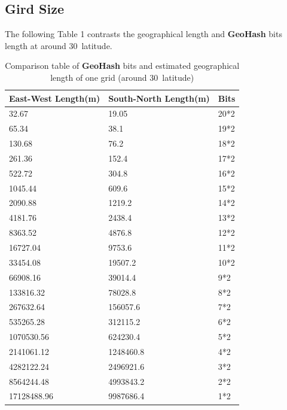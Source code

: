 \documentclass[sigplan,screen]{acmart}
\begin{document}
\subsection{Gird Size}
The following Table 1 contrasts the geographical length and \textbf{GeoHash} bits length at around 30\degree\ latitude.
\begin{table}[htb]
	\caption{Comparison table of \textbf{GeoHash} bits and estimated geographical length of one grid (around 30\degree\ latitude)}
	\begin{tabular}{lll}
		\toprule
		East-West Length(m) & South-North Length(m) & Bits \\
		\midrule
		32.67               & 19.05                 & 20*2 \\
		65.34               & 38.1                  & 19*2 \\
		130.68              & 76.2                  & 18*2 \\
		261.36              & 152.4                 & 17*2 \\
		522.72              & 304.8                 & 16*2 \\
		1045.44             & 609.6                 & 15*2 \\
		2090.88             & 1219.2                & 14*2 \\
		4181.76             & 2438.4                & 13*2 \\
		8363.52             & 4876.8                & 12*2 \\
		16727.04            & 9753.6                & 11*2 \\
		33454.08            & 19507.2               & 10*2 \\
		66908.16            & 39014.4               & 9*2  \\
		133816.32           & 78028.8               & 8*2  \\
		267632.64           & 156057.6              & 7*2  \\
		535265.28           & 312115.2              & 6*2  \\
		1070530.56          & 624230.4              & 5*2  \\
		2141061.12          & 1248460.8             & 4*2  \\
		4282122.24          & 2496921.6             & 3*2  \\
		8564244.48          & 4993843.2             & 2*2  \\
		17128488.96         & 9987686.4             & 1*2  \\
		\bottomrule
	\end{tabular}
\end{table}
\end{document}
